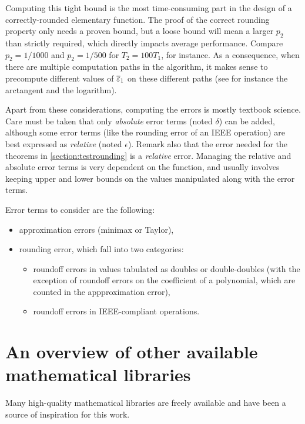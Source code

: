 Computing this tight bound is the most time-consuming part in the
design of a correctly-rounded elementary function. The proof of the
correct rounding property only needs a proven bound, but a loose bound
will mean a larger $p_2$ than strictly required, which directly
impacts average performance. Compare $p_2=1/1000$ and $p_2=1/500$ for
$T_2=100T_1$, for instance. As a consequence, when there are multiple
computation paths in the algorithm, it makes sense to precompute
different values of ${\overline{\varepsilon}}_1$ on these different paths (see for
instance the arctangent and the logarithm).






Apart from these considerations, computing the errors is mostly
textbook science. Care must be taken that only \emph{absolute} error
terms (noted $\delta$) can be added, although some error terms (like
the rounding error of an IEEE operation) are best expressed as
\emph{relative} (noted $\epsilon$). Remark also that the error needed
for the theorems in \ref{section:testrounding} is a \emph{relative}
error.  Managing the relative and absolute error terms is very
dependent on the function, and usually involves keeping upper and
lower bounds on the values manipulated along with the error terms.

Error terms to consider are the following:
\begin{itemize}
\item approximation errors  (minimax or Taylor),
\item rounding error, which fall into two categories:
  \begin{itemize}
  \item roundoff errors in values tabulated as doubles or
    double-doubles (with the exception of roundoff errors on the coefficient
    of a polynomial, which are counted in the appproximation error),
  \item roundoff errors in IEEE-compliant operations.
  \end{itemize}
\end{itemize}




\section{An overview of other  available mathematical libraries\label{section:lib-overview}}

Many high-quality mathematical libraries are freely available and have
been a source of inspiration for this work.

